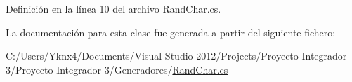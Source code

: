 Definición en la línea 10 del archivo Rand\-Char.\-cs.



La documentación para esta clase fue generada a partir del siguiente fichero\-:\begin{DoxyCompactItemize}
\item 
C\-:/\-Users/\-Yknx4/\-Documents/\-Visual Studio 2012/\-Projects/\-Proyecto Integrador 3/\-Proyecto Integrador 3/\-Generadores/\hyperlink{_rand_char_8cs}{Rand\-Char.\-cs}\end{DoxyCompactItemize}
